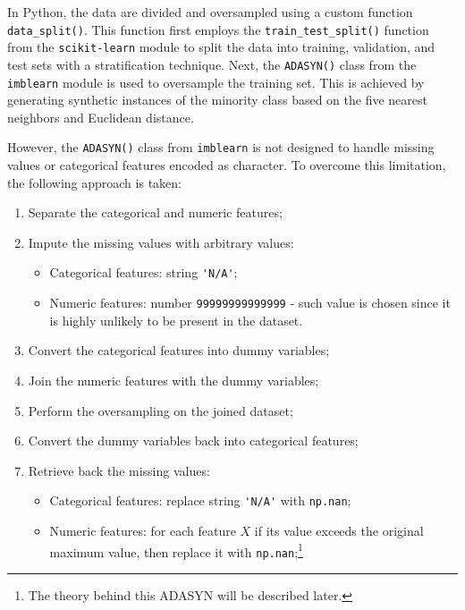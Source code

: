         In Python, the data are divided and oversampled using a custom function \lstinline{data_split()}.
        This function first employs the \lstinline{train_test_split()} function from the \lstinline{scikit-learn} module to split the data into training, validation, and test sets with a stratification technique.
        Next, the \lstinline{ADASYN()} class from the \lstinline{imblearn} module is used to oversample the training set. This is achieved by generating synthetic instances of the minority class based on the five nearest neighbors and Euclidean distance.
        
        However, the \lstinline{ADASYN()} class from \lstinline{imblearn} is not designed to handle missing values or categorical features encoded as character. To overcome this limitation, the following approach is taken:
        \begin{enumerate}
            \item Separate the categorical and numeric features;
            \item Impute the missing values with arbitrary values:
            \begin{itemize}
            \item Categorical features: string \lstinline{'N/A'};
            \item Numeric features: number \lstinline{99999999999999} - such value is chosen since it is highly unlikely to be present in the dataset.
            \end{itemize}
            \item Convert the categorical features into dummy variables;
            \item Join the numeric features with the dummy variables;
            \item Perform the oversampling on the joined dataset;
            \item Convert the dummy variables back into categorical features;
            \item Retrieve back the missing values:
            \begin{itemize}
            \item Categorical features: replace string \lstinline{'N/A'} with \lstinline{np.nan};
            \item Numeric features: for each feature $X$ if its value exceeds the original maximum value, then replace it with \lstinline{np.nan};\footnote{The theory behind this ADASYN will be described later.}
            \end{itemize}
            \end{enumerate}
        
